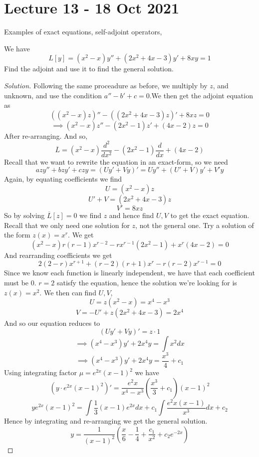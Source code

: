 \section{Lecture 13 - 18 Oct 2021}
Examples of exact equations, self-adjoint operators, 
\begin{example}
  We have 
  \[L[y]=(x^2-x)y'' + (2x^2+4x-3)y' + 8xy = 1\]
  Find the adjoint and use it to find the general solution.
\end{example}
\begin{proof}[Solution]
  Following the same proceadure as before, we multiply by $z$, and unknown, and use the
  condition $a''-b'+c =0$.We then get the adjoint equation as
  \[((x^2-x)z)'' - ((2x^2+4x-3)z)' + 8xz =0\]
  \[\implies (x^2-x)z'' - (2x^2-1)z' + (4x-2)z=0\]
  After re-arranging. And so,
  \[\overline{L}= (x^2-x)\frac{d^2}{dx^2} - (2x^2-1)\frac{d}{dx} + (4x-2)\]
  Recall that we want to rewrite the equation in an exact-form, so we need
  \[azy''+bzy'+czy = (Uy'+Vy)' = Uy''+(U'+V)y'+V'y\]
  Again, by equating coefficients we find
  \[U=(x^2-x)z\]
  \[U'+V = (2x^2+4x-3)z\]
  \[V'=8xz\]
  So by solving $\overline{L}[z]=0$ we find $z$ and hence find $U,V$ to get the exact
  equation. Recall that we only need one solution for $z$, not the general one. Try a
  solution of the form $z(x)=x^r$. We get
  \[(x^2-x)r(r-1)x^{r-2} - rx^{r-1}(2x^2-1) + x^r(4x-2)=0\]
  And rearranding coefficients we get
  \[2(2-r)x^{r+1}+(r-2)(r+1)x^r -r(r-2)x^{r-1}=0\]
  Since we know each function is linearly independent, we have that each coefficient must
  be $0$. $r=2$ satisfy the equation, hence the solution we're looking for is $z(x)=x^2$.
  We then can find $U,V$,
  \[U=z(x^2-x) = x^4-x^3\]
  \[V=-U'+z(2x^2+4x-3) = 2x^4\]
  And so our equation reduces to
  \[(Uy'+Vy)'= z\cdot 1\]
  \[\implies (x^4-x^3)y' +2x^4y = \int x^2 dx\]
  \[\implies (x^4-x^3)y' +2x^4y = \frac{x^3}{4}+c_1\]
  Using integrating factor $\mu=e^{2x}(x-1)^2$ we have 
  \[(y\cdot e^{2x}(x-1)^2)'= \frac{e^2x}{x^4-x^3} (\frac{x^{3}}{3} +c_1)(x-1)^2\]
  \[y e^{2x}(x-1)^{2} = \int\frac{1}{3}(x-1)e^{2x}dx + c_1\int \frac{e^2x(x-1)}{x^3}dx +
  c_2\]
  Hence by integrating and re-arranging we get the general solution.
  \[y= \frac{1}{(x-1)^2} (\frac{x}{6}-\frac{1}{4} + \frac{c_1}{x^2} +c_2e^{-2x})\]
\end{proof}


